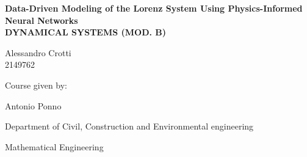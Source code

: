\documentclass[12pt]{report}
\author{Javad Ibrahimli}
\numberwithin{figure}{chapter}
\begin{document}

\begin{titlepage}
{\color{purple}
\begin{center}
    
    \vspace*{-2.5cm}
    
    \vspace{5cm}
    

    \vspace{1cm}
    {\textbf{Data-Driven Modeling of the Lorenz System Using Physics-Informed Neural Networks\\}}
    \vspace{2.4cm}
    {\textbf{DYNAMICAL SYSTEMS (MOD. B)\\}}
    \vspace{0.3cm}
    
    Alessandro Crotti \\
    2149762\\
    \vspace{0.9cm}
    {\begin{singlespace}Course given by:\\\end{singlespace}}
    {\begin{singlespace}Antonio Ponno
    \\\end{singlespace}}


\end{center}
{\raggedleft\vfill{\begin{singlespace}
     Department of Civil, Construction and Environmental engineering\\
\end{singlespace}
 Mathematical Engineering\\
 \begin{singlespace}

 
 \end{singlespace} 
 
}\par
}
}
\end{titlepage}




\tableofcontents 
\end{document}
